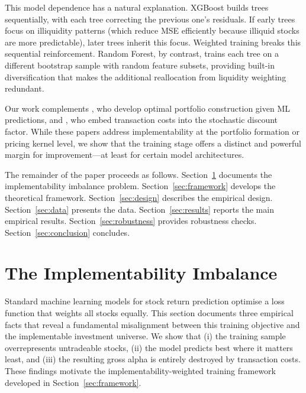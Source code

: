 \documentclass[a4paper,12pt,final]{article}
\begin{document}
This model dependence has a natural explanation. XGBoost builds trees sequentially, with each tree correcting the previous one's residuals. If early trees focus on illiquidity patterns (which reduce MSE efficiently because illiquid stocks are more predictable), later trees inherit this focus. Weighted training breaks this sequential reinforcement. Random Forest, by contrast, trains each tree on a different bootstrap sample with random feature subsets, providing built-in diversification that makes the additional reallocation from liquidity weighting redundant.

Our work complements \citet{jensen2024machine}, who develop optimal portfolio construction given ML predictions, and \citet{bianchi2026transaction}, who embed transaction costs into the stochastic discount factor. While these papers address implementability at the portfolio formation or pricing kernel level, we show that the training stage offers a distinct and powerful margin for improvement---at least for certain model architectures.

The remainder of the paper proceeds as follows. Section~\ref{sec:problem} documents the implementability imbalance problem. Section~\ref{sec:framework} develops the theoretical framework. Section~\ref{sec:design} describes the empirical design. Section~\ref{sec:data} presents the data. Section~\ref{sec:results} reports the main empirical results. Section~\ref{sec:robustness} provides robustness checks. Section~\ref{sec:conclusion} concludes.


\section{The Implementability Imbalance}
\label{sec:problem}

Standard machine learning models for stock return prediction optimise a loss function that weights all stocks equally. This section documents three empirical facts that reveal a fundamental misalignment between this training objective and the implementable investment universe. We show that (i) the training sample overrepresents untradeable stocks, (ii) the model predicts best where it matters least, and (iii) the resulting gross alpha is entirely destroyed by transaction costs. These findings motivate the implementability-weighted training framework developed in Section~\ref{sec:framework}.
\end{document}

